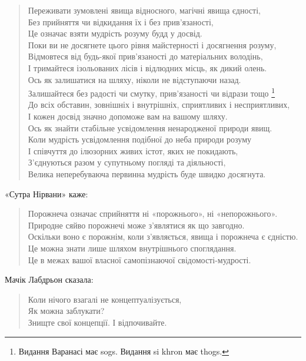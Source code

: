 \documentclass{article}
\begin{document}
\begin{verse}
        Переживати зумовлені явища відносного, магічні явища єдності, \\
        Без прийняття чи відкидання їх і без прив’язаності, \\
        Це означає взяти мудрість розуму будд у досвід. \\
        Поки ви не досягнете цього рівня майстерності і досягнення розуму, \\
        Відмовтеся від будь-якої прив’язаності до матеріальних володінь, \\
        І тримайтеся ізольованих лісів і відлюдних місць, як дикий олень. \\
        Ось як залишатися на шляху, ніколи не відступаючи назад. \\
        Залишайтеся без радості чи смутку, прив’язаності чи відрази тощо \footnote{Видання Варанасі має sogs. Видання si khron має thogs.} \\
        До всіх обставин, зовнішніх і внутрішніх, сприятливих і несприятливих, \\
        І кожен досвід значно допоможе вам на вашому шляху. \\
        Ось як знайти стабільне усвідомлення ненародженої природи явищ. \\
        Коли мудрість усвідомлення подібної до неба природи розуму \\
        І співчуття до ілюзорних живих істот, яких не покидають, \\
        З’єднуються разом у супутньому погляді та діяльності, \\
        Велика неперебуваюча первинна мудрість буде швидко досягнута.
\end{verse}

«Сутра Нірвани» каже:

\begin{verse}
        Порожнеча означає сприйняття ні «порожнього», ні «непорожнього». \\
        Природне сяйво порожнечі може з’являтися як що завгодно. \\
        Оскільки воно є порожнім, коли з’являється, явища і порожнеча є єдністю. \\
        Це можна знати лише шляхом внутрішнього споглядання. \\
        Це в межах вашої власної самопізнаючої свідомості-мудрості.
\end{verse}

Мачік Лабдрьон сказала:

\begin{verse}
        Коли нічого взагалі не концептуалізується, \\
        Як можна заблукати? \\
        Знищте свої концепції. І відпочивайте.
\end{verse}
\end{document}
